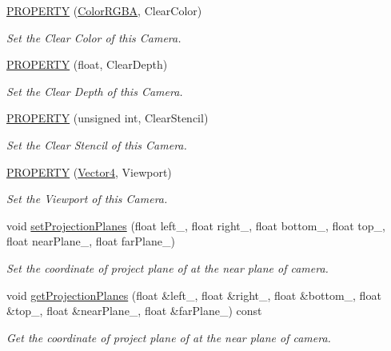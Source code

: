 \begin{DoxyCompactItemize}
\hyperlink{class_magnum_1_1_camera_component_a0eae24223559e50c71b0bc86ebac663f}{P\+R\+O\+P\+E\+R\+TY} (\hyperlink{class_magnum_1_1_color_r_g_b_a}{Color\+R\+G\+BA}, Clear\+Color)
\begin{DoxyCompactList}\small\item\em Set the Clear Color of this Camera. \end{DoxyCompactList}\item 
\hyperlink{class_magnum_1_1_camera_component_a3469e31f41b35c54963463cb05d62d22}{P\+R\+O\+P\+E\+R\+TY} (float, Clear\+Depth)
\begin{DoxyCompactList}\small\item\em Set the Clear Depth of this Camera. \end{DoxyCompactList}\item 
\hyperlink{class_magnum_1_1_camera_component_a9adf263660e4b03c2f77de49dd7900e0}{P\+R\+O\+P\+E\+R\+TY} (unsigned int, Clear\+Stencil)
\begin{DoxyCompactList}\small\item\em Set the Clear Stencil of this Camera. \end{DoxyCompactList}\item 
\hyperlink{class_magnum_1_1_camera_component_a65676fa2193d9bedf3449f6db06ed07c}{P\+R\+O\+P\+E\+R\+TY} (\hyperlink{class_magnum_1_1_vector4}{Vector4}, Viewport)
\begin{DoxyCompactList}\small\item\em Set the Viewport of this Camera. \end{DoxyCompactList}\item 
void \hyperlink{class_magnum_1_1_camera_component_ab50fcc345c5beb14317b4bb74f6c2b2e}{set\+Projection\+Planes} (float left\+\_\+, float right\+\_\+, float bottom\+\_\+, float top\+\_\+, float near\+Plane\+\_\+, float far\+Plane\+\_\+)
\begin{DoxyCompactList}\small\item\em Set the coordinate of project plane of at the near plane of camera. \end{DoxyCompactList}\item 
void \hyperlink{class_magnum_1_1_camera_component_af5d94dcadd4011e3a0dad972c8eadd9b}{get\+Projection\+Planes} (float \&left\+\_\+, float \&right\+\_\+, float \&bottom\+\_\+, float \&top\+\_\+, float \&near\+Plane\+\_\+, float \&far\+Plane\+\_\+) const 
\begin{DoxyCompactList}\small\item\em Get the coordinate of project plane of at the near plane of camera. \end{DoxyCompactList}\item 

\end{DoxyCompactItemize}
